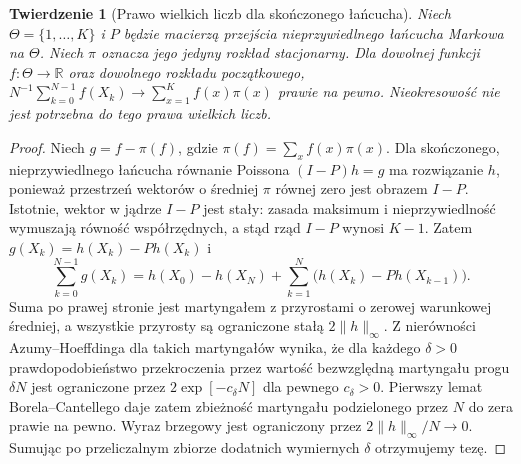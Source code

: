 \documentclass[11pt,a4paper,oneside]{report}
\numberwithin{equation}{chapter}
\theoremstyle{plain}
\newtheorem{twierdzenie}{Twierdzenie}[chapter]
\theoremstyle{definition}
\theoremstyle{remark}
\newcommand{\R}{\mathbb R}
\newcommand{\norm}[1]{\lVert#1\rVert}
\begin{document}
\begin{twierdzenie}[Prawo wielkich liczb dla skończonego łańcucha]
\label{thm:mcmc-finite-slln}
Niech $\Theta=\{1,\ldots,K\}$ i $P$ będzie macierzą
przejścia nieprzywiedlnego łańcucha Markowa na $\Theta$.
Niech $\pi$ oznacza jego jedyny rozkład stacjonarny.
Dla dowolnej funkcji $f\colon\Theta\to\R$ oraz
\emph{dowolnego} rozkładu początkowego,
$N^{-1}\sum_{k=0}^{N-1}f(X_k)\to\sum_{x=1}^Kf(x)\pi(x)$
prawie na pewno. Nieokresowość nie jest potrzebna
do tego prawa wielkich liczb.
\end{twierdzenie}
\begin{proof}
Niech $g=f-\pi(f)$, gdzie
$\pi(f)=\sum_xf(x)\pi(x)$. Dla skończonego,
nieprzywiedlnego łańcucha równanie Poissona
$(I-P)h=g$ ma rozwiązanie $h$, ponieważ przestrzeń
wektorów o średniej $\pi$ równej zero jest obrazem
$I-P$. Istotnie, wektor w jądrze $I-P$ jest stały:
zasada maksimum i nieprzywiedlność wymuszają
równość współrzędnych, a stąd rząd $I-P$ wynosi $K-1$.
Zatem $g(X_k)=h(X_k)-Ph(X_k)$ i
\[
 \sum_{k=0}^{N-1}g(X_k)
 =h(X_0)-h(X_N)+\sum_{k=1}^{N}
   \big(h(X_k)-Ph(X_{k-1})\big).
\]
Suma po prawej stronie jest martyngałem z przyrostami
o zerowej warunkowej średniej, a wszystkie przyrosty
są ograniczone stałą $2\norm h_\infty$.
Z nierówności Azumy--Hoeffdinga dla takich martyngałów
wynika, że dla każdego $\delta>0$ prawdopodobieństwo
przekroczenia przez wartość bezwzględną martyngału
progu $\delta N$ jest ograniczone przez
$2\exp[-c_\delta N]$ dla pewnego $c_\delta>0$.
Pierwszy lemat Borela--Cantellego daje zatem
zbieżność martyngału podzielonego przez $N$ do zera
prawie na pewno. Wyraz brzegowy jest ograniczony
przez $2\norm h_\infty/N\to0$. Sumując po
przeliczalnym zbiorze dodatnich wymiernych $\delta$
otrzymujemy tezę.
\end{proof}
\end{document}
